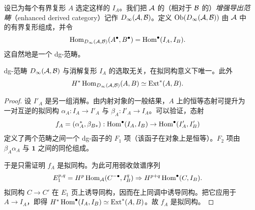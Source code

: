 设已为每个有界复形 $A$ 选定这样的 $I_A$。我们把 $\mathcal{A}$ 的（相对于 $\mathcal{B}$ 的）\emph{增强导出范畴}（enhanced derived category）记作 $D_\infty(\mathcal{A},\mathcal{B})$。定义 $\operatorname{Ob}(D_\infty(\mathcal{A},\mathcal{B}))$ 由 $\mathcal{A}$ 中的有界复形组成，并令
\[
  \operatorname{Hom}_{D_\infty(\mathcal{A},\mathcal{B})}(A^\bullet, B^\bullet) = \operatorname{Hom}^\bullet(I_A, I_B).
\]
这自然地是一个 dg-范畴。


\begin{proposition}\label{prop:3.1}
dg-范畴 $D_\infty(\mathcal{A},\mathcal{B})$ 与消解复形 $I_A$ 的选取无关，在拟同构意义下唯一。此外
\[
  H^*\operatorname{Hom}_{D_\infty(\mathcal{A},\mathcal{B})}(A,B) \simeq \operatorname{Ext}^*(A,B).
\]
\end{proposition}

\begin{proof}
设 $I'_A$ 是另一组消解。由内射对象的一般结果，$A$ 上的恒等态射可提升为一对互逆的拟同构 $\alpha_A: I_A\to I'_A$ 与 $\beta_A: I'_A\to I_A$。可以验证，态射
\[
  f_A = (\alpha_A^*, \beta_{B*}) : \operatorname{Hom}^\bullet(I_A, I_B) \to \operatorname{Hom}^\bullet(I'_A, I'_B)
\]
定义了两个范畴之间一个 dg-函子的 $F_1$ 项（该函子在对象上是恒等）。$F_2$ 项由 $\beta_A\alpha_A$ 与 $\mathbf 1$ 之间的同伦组成。


于是只需证明 $f_A$ 是拟同构。为此可用弱收敛谱序列
\[
  E_1^{p,q} = H^p\operatorname{Hom}_{\mathcal{A}}(C^{-\bullet}, I_B^q) \Rightarrow H^{p+q}\operatorname{Hom}^\bullet(C, I_B).
\]
拟同构 $C\to C'$ 在 $E_1$ 页上诱导同构，因而在上同调中诱导同构。把它应用于 $A\to I_A$，即得 $H^*\operatorname{Hom}^\bullet(I_A,I_B)\simeq\operatorname{Ext}^*(A,B)$。故 $f_A$ 是拟同构。
\end{proof}


